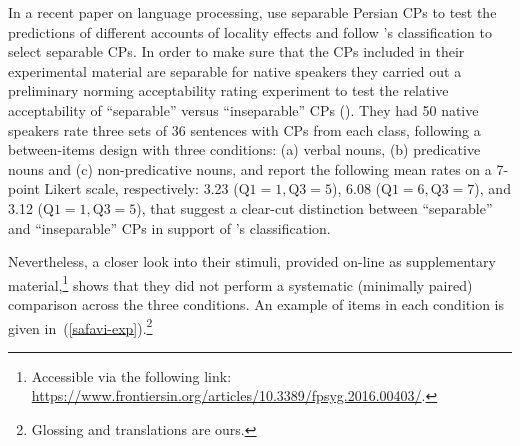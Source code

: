 \documentclass[output=paper]{langsci/langscibook}
\begin{document}
In a recent paper on language processing, \citet{SafaviEtal2016} use separable Persian CPs to test the predictions of different accounts of locality effects and follow \citeauthor{Karimi-Doostan:2011}'s classification to select separable CPs. In order to make sure that the CPs included in their experimental material are separable for native speakers they carried out a preliminary norming acceptability rating experiment to test the relative acceptability of ``separable'' versus ``inseparable'' CPs (\citeyear[4]{SafaviEtal2016}). 
They had 50 native speakers rate three sets of 36 sentences with CPs from each class, following a between-items design with three conditions: (a) verbal nouns, (b) predicative nouns and (c) non-predicative nouns, and report the following mean rates on a 7-point Likert scale, respectively: 3.23 ($\text{Q1}=1, \text{Q3}=5$), 6.08 ($\text{Q1}=6, \text{Q3}=7$), and 3.12 ($\text{Q1}=1, \text{Q3}=5$), that suggest a clear-cut distinction between ``separable'' and ``inseparable'' CPs in support of \citeauthor{Karimi-Doostan1997}'s classification.

Nevertheless, a closer look into their stimuli, provided on-line as supplementary material,\footnote{Accessible via the following link: \url{https://www.frontiersin.org/articles/10.3389/fpsyg.2016.00403/}.} shows that they did not perform a systematic (minimally paired) comparison across the three conditions. 
An example of items in each condition is given in~(\ref{safavi-exp}).\footnote{Glossing and translations are ours.}

\begin{exe}
	\ex\label{safavi-exp}
	\begin{xlist}
		
	\end{xlist}
\end{exe}
\end{document}
